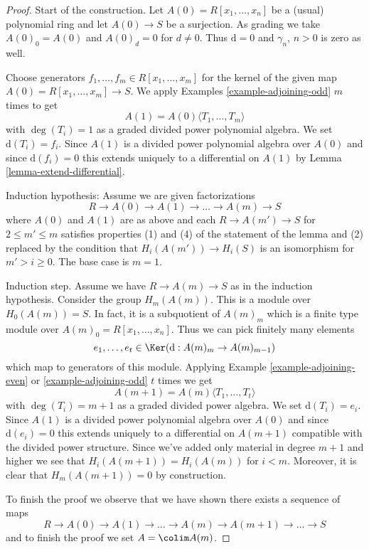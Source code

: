 \begin{proof}
Start of the construction. Let $A(0) = R[x_1, \ldots, x_n]$ be
a (usual) polynomial ring and let $A(0) \to S$ be a surjection.
As grading we take $A(0)_0 = A(0)$ and $A(0)_d = 0$ for $d \not = 0$.
Thus $\text{d} = 0$ and $\gamma_n$, $n > 0$ is zero as well.

\medskip\noindent
Choose generators $f_1, \ldots, f_m \in R[x_1, \ldots, x_m]$
for the kernel of the given map $A(0) = R[x_1, \ldots, x_m] \to S$.
We apply Examples \ref{example-adjoining-odd} $m$ times to get
$$
A(1) = A(0)\langle T_1, \ldots, T_m\rangle
$$
with $\deg(T_i) = 1$ as a graded divided power polynomial algebra.
We set $\text{d}(T_i) = f_i$. Since $A(1)$ is a divided power polynomial
algebra over $A(0)$ and since $\text{d}(f_i) = 0$
this extends uniquely to a differential on $A(1)$ by
Lemma \ref{lemma-extend-differential}.

\medskip\noindent
Induction hypothesis: Assume we are given factorizations
$$
R \to A(0) \to A(1) \to \ldots \to A(m) \to S
$$
where $A(0)$ and $A(1)$ are as above and each $R \to A(m') \to S$
for $2 \leq m' \leq m$ satisfies properties (1) and (4)
of the statement of the lemma and (2) replaced by the condition that
$H_i(A(m')) \to H_i(S)$ is an isomorphism for
$m' > i \geq 0$. The base case is $m = 1$.

\medskip\noindent
Induction step. Assume we have $R \to A(m) \to S$
as in the induction hypothesis. Consider the
group $H_m(A(m))$. This is a module over $H_0(A(m)) = S$.
In fact, it is a subquotient of $A(m)_m$ which is a finite
type module over $A(m)_0 = R[x_1, \ldots, x_n]$.
Thus we can pick finitely many elements
$$
e_1, \ldots, e_t \in \Ker(\text{d} : A(m)_m \to A(m)_{m - 1})
$$
which map to generators of this module. Applying
Example \ref{example-adjoining-even} or
\ref{example-adjoining-odd} $t$ times we get
$$
A(m + 1) = A(m)\langle T_1, \ldots, T_t\rangle
$$
with $\deg(T_i) = m + 1$ as a graded divided power algebra. We set
$\text{d}(T_i) = e_i$. Since $A(1)$ is a divided power polynomial
algebra over $A(0)$ and since $\text{d}(e_i) = 0$
this extends uniquely to a differential on $A(m + 1)$
compatible with the divided power structure.
Since we've added only material in degree $m + 1$ and higher we see
that $H_i(A(m + 1)) = H_i(A(m))$ for $i < m$. Moreover, it is
clear that $H_m(A(m + 1)) = 0$ by construction.

\medskip\noindent
To finish the proof we observe that we have shown there exists
a sequence of maps
$$
R \to A(0) \to A(1) \to \ldots \to A(m) \to A(m + 1) \to \ldots \to S
$$
and to finish the proof we set $A = \colim A(m)$.
\end{proof}

